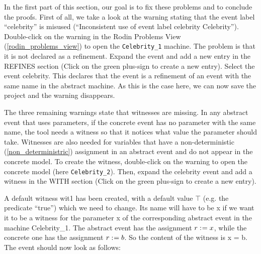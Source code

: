 In the first part of this section, our goal is to fix these problems and to conclude the proofs. First of all, we take a look at the warning stating that the event label ``celebrity'' is misused (``Inconsistent use of event label celebrity	Celebrity''). Double-click on the warning in the Rodin Problems View (\ref{rodin_problems_view}) to open the \texttt{Celebrity\_1} machine. The problem is that it is not declared as a refinement. Expand the event and add a new entry in the \textsf{REFINES} section (Click on the green plus-sign to create a new entry). Select the event \textsf{celebrity}. This declares that the event is a refinement of an event with the same name in the abstract machine. As this is the case here, we can now save the project and the warning disappears.

The three remaining warnings state that witnesses are missing. In any abstract event that uses parameters, if the concrete event has no parameter with the same name, the tool needs a witness so that it notices what value the parameter should take. Witnesses are also needed for variables that have a non-deterministic (\ref{non_deterministric}) assignment in an abstract event and do not appear in the concrete model. To create the witness, double-click on the warning to open the concrete model (here \texttt{Celebrity\_2}). Then, expand the \textsf{celebrity} event and add a witness in the \textsf{WITH} section (Click on the green plus-sign to create a new entry).

A default witness wit1 has been created, with a default value \textsf{$\top$} (e.g. the predicate ``true'') which we need to change. Its name will have to be \textsf{x} if we want it to be a witness for the parameter x of the corresponding abstract event in the machine Celebrity\_1. The abstract event has the assignment \textsf{$r \mathrel{:\mkern1mu=} x$}, while the concrete one has the assignment \textsf{$r \mathrel{:\mkern1mu=} b$}. So the content of the witness is \textsf{x = b}. The event should now look as follows: 

\begin{description}
		\begin{description}
		\WhenGrd
			\begin{description}
			\end{description}
		\Witnesses
			\begin{description}
			\nItem{ x }{ x=b }
			\end{description}
		\ThenAct
			\begin{description}
			\nItemX{ act1 }{ r :=  b }
			\end{description}
		\EndAct
		\end{description}
\end{description}

